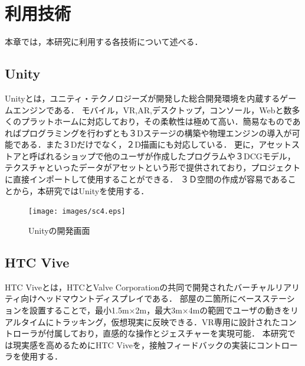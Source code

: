 ﻿\chapter{利用技術}
本章では，本研究に利用する各技術について述べる．

\section{Unity}

Unityとは，ユニティ・テクノロジーズが開発した総合開発環境を内蔵するゲームエンジンである．
モバイル，VR,AR,デスクトップ，コンソール，Webと数多くのプラットホームに対応しており，その柔軟性は極めて高い．簡易なものであればプログラミングを行わずとも３Dステージの構築や物理エンジンの導入が可能である．また３Dだけでなく，２D描画にも対応している．
更に，アセットストアと呼ばれるショップで他のユーザが作成したプログラムや３DCGモデル，テクスチャといったデータがアセットという形で提供されており，プロジェクトに直接インポートして使用することができる．
３Ｄ空間の作成が容易であることから，本研究ではUnityを使用する．

\begin{figure}[htb]
\centering
\texttt{[image: images/sc4.eps]}
\caption{Unityの開発画面}
\label{fig:unity}
\end{figure}

\section{HTC Vive}

HTC Viveとは，HTCとValve Corporationの共同で開発されたバーチャルリアリティ向けヘッドマウントディスプレイである．
部屋の二箇所にベースステーションを設置することで，最小1.5m×2m，最大3m×4mの範囲でユーザの動きをリアルタイムにトラッキング，仮想現実に反映できる．VR専用に設計されたコントローラが付属しており，直感的な操作とジェスチャーを実現可能．
本研究では現実感を高めるためにHTC Viveを，接触フィードバックの実装にコントローラを使用する．

